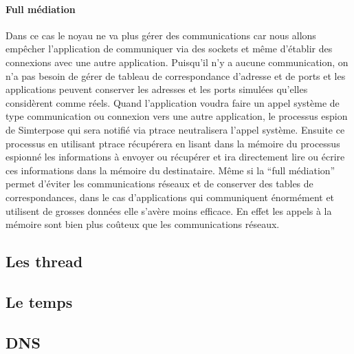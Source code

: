 \paragraph{Full médiation} 
Dans ce cas le noyau ne va plus gérer des communications car nous allons
empêcher l'application de communiquer via des sockets et même d'établir des
connexions avec une autre application.  Puisqu'il n'y a aucune communication, on
n'a pas besoin de gérer de tableau de correspondance d'adresse et de ports et
les applications peuvent conserver les adresses et les ports simulées qu'elles considèrent
comme réels. Quand l'application voudra faire un appel système de type
communication ou connexion vers une autre application, le processus espion de Simterpose qui
sera notifié via ptrace neutralisera l'appel système. Ensuite ce processus en
utilisant ptrace récupérera en lisant dans la mémoire du processus espionné les
informations à envoyer ou récupérer et ira directement lire ou écrire ces
informations dans la mémoire du destinataire.  Même si la ``full médiation''
permet d'éviter les communications réseaux et de conserver des tables de
correspondances, dans le cas d'applications qui communiquent énormément et
utilisent de grosses données elle s'avère moins efficace. En effet les appels à
la mémoire sont bien plus coûteux que les communications réseaux.

\subsection{Les thread}

\subsection{Le temps}

\subsection{DNS}

